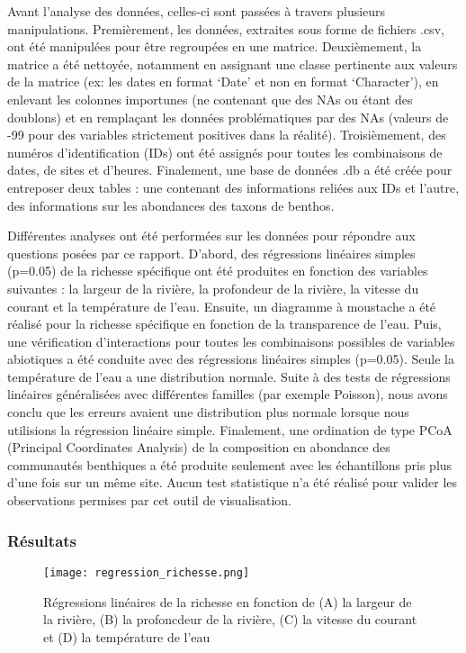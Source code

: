 \documentclass[
]{article}
\begin{document}
Avant l'analyse des données, celles-ci sont passées à travers plusieurs
manipulations. Premièrement, les données, extraites sous forme de
fichiers .csv, ont été manipulées pour être regroupées en une matrice.
Deuxièmement, la matrice a été nettoyée, notamment en assignant une
classe pertinente aux valeurs de la matrice (ex: les dates en format
`Date' et non en format `Character'), en enlevant les colonnes
importunes (ne contenant que des NAs ou étant des doublons) et en
remplaçant les données problématiques par des NAs (valeurs de -99 pour
des variables strictement positives dans la réalité). Troisièmement, des
numéros d'identification (IDs) ont été assignés pour toutes les
combinaisons de dates, de sites et d'heures. Finalement, une base de
données .db a été créée pour entreposer deux tables : une contenant des
informations reliées aux IDs et l'autre, des informations sur les
abondances des taxons de benthos.

Différentes analyses ont été performées sur les données pour répondre
aux questions posées par ce rapport. D'abord, des régressions linéaires
simples (p=0.05) de la richesse spécifique ont été produites en fonction
des variables suivantes : la largeur de la rivière, la profondeur de la
rivière, la vitesse du courant et la température de l'eau. Ensuite, un
diagramme à moustache a été réalisé pour la richesse spécifique en
fonction de la transparence de l'eau. Puis, une vérification
d'interactions pour toutes les combinaisons possibles de variables
abiotiques a été conduite avec des régressions linéaires simples
(p=0.05). Seule la température de l'eau a une distribution normale.
Suite à des tests de régressions linéaires généralisées avec différentes
familles (par exemple Poisson), nous avons conclu que les erreurs
avaient une distribution plus normale lorsque nous utilisions la
régression linéaire simple. Finalement, une ordination de type PCoA
(Principal Coordinates Analysis) de la composition en abondance des
communautés benthiques a été produite seulement avec les échantillons
pris plus d'une fois sur un même site. Aucun test statistique n'a été
réalisé pour valider les observations permises par cet outil de
visualisation.

\hypertarget{ruxe9sultats}{%
\subsubsection{Résultats}\label{ruxe9sultats}}

\begin{figure}[h]
\centering
\texttt{[image: regression\_richesse.png]}
\caption{Régressions linéaires de la richesse en fonction de (A) la largeur de la rivière, (B) la profoncdeur de la rivière, (C) la vitesse du courant et (D) la température de l'eau}
\label{fig:regression_richesse}
\end{figure}
\end{document}
